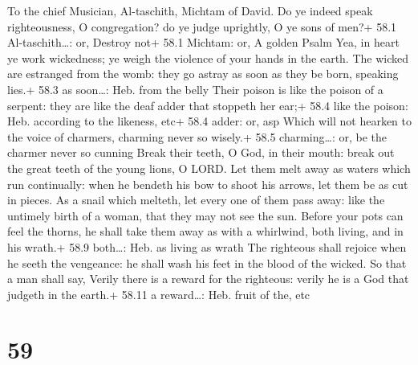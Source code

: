 To the chief Musician, Al-taschith, Michtam of David.  Do ye
indeed speak righteousness, O congregation? do ye judge uprightly, O ye
sons of men?+ 58.1 Al-taschith\ldots: or, Destroy not+ 58.1 Michtam: or,
A golden Psalm  Yea, in heart ye work wickedness; ye weigh
the violence of your hands in the earth.  The wicked are
estranged from the womb: they go astray as soon as they be born,
speaking lies.+ 58.3 as soon\ldots: Heb. from the belly 
Their poison is like the poison of a serpent: they are like the deaf
adder that stoppeth her ear;+ 58.4 like the poison: Heb. according to
the likeness, etc+ 58.4 adder: or, asp  Which will not
hearken to the voice of charmers, charming never so wisely.+ 58.5
charming\ldots: or, be the charmer never so cunning  Break
their teeth, O God, in their mouth: break out the great teeth of the
young lions, O LORD.  Let them melt away as waters which run
continually: when he bendeth his bow to shoot his arrows, let them be as
cut in pieces.  As a snail which melteth, let every one of
them pass away: like the untimely birth of a woman, that they may not
see the sun.  Before your pots can feel the thorns, he shall
take them away as with a whirlwind, both living, and in his wrath.+ 58.9
both\ldots: Heb. as living as wrath  The righteous shall
rejoice when he seeth the vengeance: he shall wash his feet in the blood
of the wicked.  So that a man shall say, Verily there is a
reward for the righteous: verily he is a God that judgeth in the earth.+
58.11 a reward\ldots: Heb. fruit of the, etc

\hypertarget{section-58}{%
\section{59}\label{section-58}}

